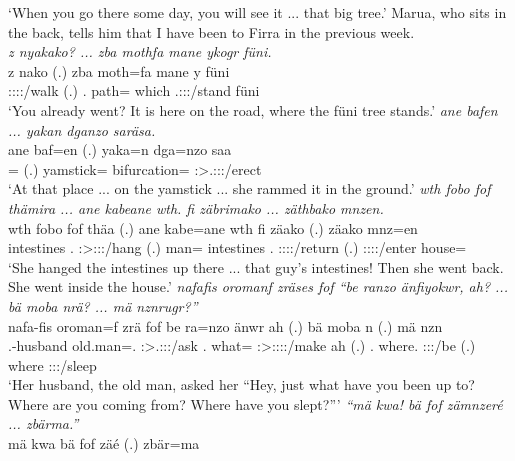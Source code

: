 \begin{exe}
	\trans `When you go there some day, you will see it ... that big tree.'
	{\footnotesize{Marua, who sits in the back, tells him that I have been to Firra in the previous week.}}\\
	\emph{z nyakako? ... zba mothfa mane ykogr füni.}\\
	\gll z nako (.) zba moth=fa mane y füni\\
	{\Iam} \Ssg:\Sbj:\Pst:\Ipfv:\Andat/walk (.) \Prox.{\Abl} path={\Abl} which \Tsg.\Masc:\Sbj:\Nonpast:\Stat/stand füni\\
	\trans `You already went? It is here on the road, where the füni tree stands.'
	\emph{ane bafen ... yakan dganzo saräsa.}\\
	\gll ane baf=en (.) yaka=n dga=nzo saa\\
	{\Dem} \Recog={\Loc} (.) yamstick={\Loc} bifurcation={\Only} \Sg:\Sbj>\Tsg.\Masc:\Obj:\Pst:\Pfv/erect\\
	\trans `At that place ... on the yamstick ... she rammed it in the ground.'
	\emph{wth fobo fof thämira ... ane kabeane wth. fi zäbrimako ... zäthbako mnzen.}\\
	\gll wth fobo fof thäa (.) ane kabe=ane wth fi zäako (.) zäako mnz=en\\
	intestines \Dist.{\All} {\Emph} \Sg:\Sbj>\Stpl:\Obj:\Pst:\Pfv/hang (.) {\Dem} man={\Poss} intestines \Third.{\Abs} \Sg:\Sbj:\Pst:\Pfv:\Andat/return (.) \Sg:\Sbj:\Pst:\Pfv:\Andat/enter house=\Loc\\
	\trans `She hanged the intestines up there ... that guy's intestines! Then she went back. She went inside the house.'
	\emph{nafafis oromanf zräses fof ``be ranzo änfiyokwr, ah? ... bä moba nrä? ... mä nznrugr?''}\\
	\gll nafa-fis oroman=f zrä fof be ra=nzo änwr ah (.) bä moba n (.) mä nzn\\
	\Third.\Poss-husband {old.man}=\Erg.{\Sg} \Stsg:\Sbj>\Tsg.\F:\Obj:\Irr:\Pfv/ask {\Emph} \Ssg.{\Erg} what={\Only} \Stsg:\Sbj>\Stpl:\Obj:\Nonpast:\Ipfv:\Venit/make ah (.) \Second.{\Abs} where.{\Abl} \Ssg:\Sbj:\Nonpast:\Ipfv/be (.) where \Ssg:\Sbj:\Rpst:\Ipfv/sleep\\
	\trans `Her husband, the old man, asked her ``Hey, just what have you been up to? Where are you coming from? Where have you slept?'''
	\emph{``mä kwa! bä fof zämnzeré ... zbärma.''}\\
	\gll mä kwa bä fof zäé (.) zbär=ma\\

\end{exe}
